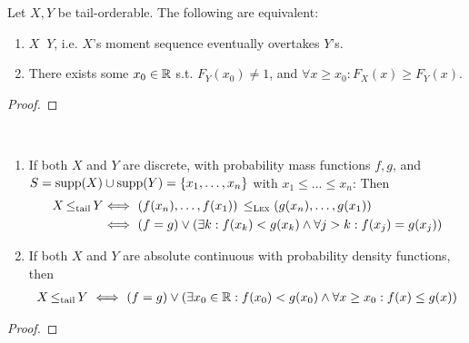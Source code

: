 \documentclass[a4paper]{scrreprt}
\DeclareMathOperator{\leqtail}{\leq_{\text{tail}}}
\DeclareMathOperator{\supp}{supp}
\DeclareMathOperator{\leqlex}{\leq_{\textsc{Lex}}}
\begin{document}
    \begin{lemma}
        Let $X, Y$ be tail-orderable.
        The following are equivalent:
        \begin{enumerate}
            \item $X \leqtail Y$, i.e. $X$'s moment sequence eventually overtakes $Y$'s.
            \item There exists some $x_0 \in \mathbb{R}$ s.t. $F_Y(x_0) \neq 1$, and $\forall x \geq x_0: F_X(x) \geq F_Y(x)$.
        \end{enumerate}
    \end{lemma}
    \begin{proof}
    \end{proof}

    \begin{cor}~
        \begin{enumerate}
            \item If both $X$ and $Y$ are discrete, with probability mass functions $f, g$, and $S = \supp(X) \cup \supp(Y) = \set{x_1, \dots, x_n}$ with $x_1 \leq \dots \leq x_n$: Then
            \begin{alignat}{2}
                X \leqtail Y 
                 &\Longleftrightarrow~ (f(x_n), \dots, f(x_1)) \;\leqlex\; (g(x_n), \dots, g(x_1)) \\
                 &\Longleftrightarrow~ (f = g) \vee (\exists k: f(x_k) < g(x_k) \wedge \forall j > k: f(x_j) = g(x_j))                 
            \end{alignat}
            \label{item:leqtailDiscreteLex}
            
            \item If both $X$ and $Y$ are absolute continuous with probability density functions, then
            \begin{gather}
                X \leqtail Y ~\Longleftrightarrow~ (f = g) \vee (\exists x_0 \in \R: f(x_0) < g(x_0) \wedge \forall x \geq x_0: f(x) \leq g(x))
            \end{gather}
            \label{item:leqtailACLex}
            
        \end{enumerate}
    \end{cor}
    \begin{proof}
    \end{proof}
    
    
\end{document}
